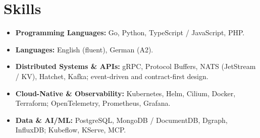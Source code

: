 \documentclass[11pt,a4paper]{resume}
\begin{document}
\section{Skills}
\begin{itemize}[leftmargin=1.4em,nosep,topsep=2pt]
  \item \textbf{Programming Languages:} Go, Python, TypeScript / JavaScript, PHP.
  \item \textbf{Languages:} English (fluent), German (A2).
  \item \textbf{Distributed Systems \& APIs:} gRPC, Protocol Buffers, NATS (JetStream / KV),
        Hatchet, Kafka; event-driven and contract-first design.
  \item \textbf{Cloud-Native \& Observability:} Kubernetes, Helm, Cilium, Docker, Terraform;
        OpenTelemetry, Prometheus, Grafana.
  \item \textbf{Data \& AI/ML:} PostgreSQL, MongoDB / DocumentDB, Dgraph, InfluxDB; Kubeflow,
        KServe, MCP.
\end{itemize}
\end{document}
